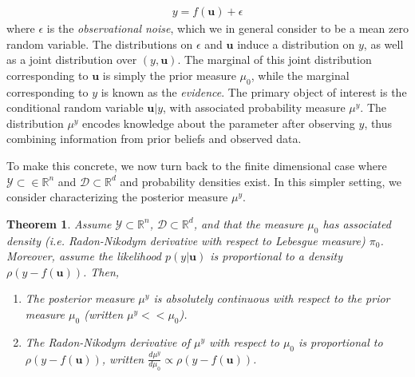\documentclass[12pt]{article}
\newcommand{\bpar}{\mathbf{u}} %
\newcommand{\R}{\mathbb{R}}
\newtheorem{thm}{Theorem}
\begin{document}
\begin{align*}
y = f(\bpar) + \epsilon
\end{align*}
where $\epsilon$ is the \textit{observational noise}, which we in general consider to be a mean zero random variable. The distributions on $\epsilon$ and $\bpar$ induce a distribution on $y$, as well as a joint 
distribution over $(y, \bpar)$. The marginal of this joint distribution corresponding to $\bpar$ is simply the prior measure $\mu_0$, while the marginal corresponding to $y$ is known as the \textit{evidence}. The primary object of interest is the conditional random variable $\bpar|y$, with associated probability measure $\mu^y$. The distribution $\mu^y$ encodes knowledge about the parameter after observing $y$, thus combining 
information from prior beliefs and observed data. 

To make this concrete, we now turn back to the finite dimensional case where $\mathcal{Y} \subset \in \R^n$ and $\mathcal{D} \subset \R^d$ and probability densities exist. In this simpler setting, we consider characterizing the posterior measure $\mu^y$. 

\begin{thm}
Assume $\mathcal{Y} \subset \R^n$, $\mathcal{D} \subset \R^d$, and that the measure $\mu_0$ has associated density (i.e. Radon-Nikodym derivative with respect to Lebesgue measure) $\pi_0$. 
Moreover, assume the likelihood $p(y|\bpar)$ is proportional to a density $\rho(y - f(\bpar))$. Then, 
\begin{enumerate}
\item The posterior measure $\mu^y$ is absolutely continuous with respect to the prior measure $\mu_0$ (written $\mu^y << \mu_0$). 
\item The Radon-Nikodym derivative of $\mu^y$ with respect to $\mu_0$ is proportional to $\rho(y - f(\bpar))$, written $\frac{d\mu^y}{d\mu_0} \propto \rho(y - f(\bpar))$. 
\end{enumerate}
\end{thm}
\end{document}
